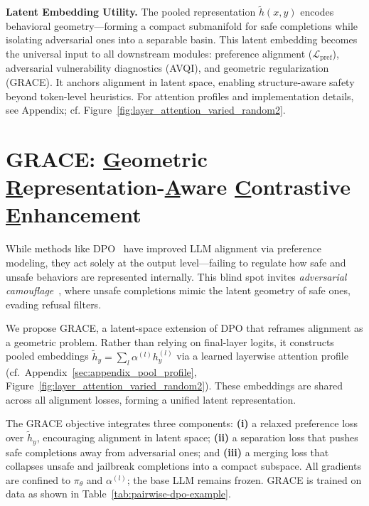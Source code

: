 \textbf{Latent Embedding Utility.} 
The pooled representation $\tilde{h}(x, y)$ encodes behavioral geometry—forming a compact submanifold for safe completions while isolating adversarial ones into a separable basin. This latent embedding becomes the universal input to all downstream modules: preference alignment ($\mathcal{L}_{\text{pref}}$), adversarial vulnerability diagnostics (AVQI), and geometric regularization (GRACE). It anchors alignment in latent space, enabling structure-aware safety beyond token-level heuristics. For attention profiles and implementation details, see Appendix; cf. Figure~\ref{fig:layer_attention_varied_random2}.








\section{\textsc{GRACE}: \underline{G}eometric \underline{R}epresentation-\underline{A}ware \underline{C}ontrastive \underline{E}nhancement}
\label{sec:grace_main}

While methods like DPO~\cite{rafailov2023direct} have improved LLM alignment via preference modeling, they act solely at the output level—failing to regulate how safe and unsafe behaviors are represented internally. This blind spot invites \emph{adversarial camouflage}~\cite{turpin2023llms, carlini2023extracting}, where unsafe completions mimic the latent geometry of safe ones, evading refusal filters.

We propose \textsc{GRACE}, a latent-space extension of DPO that reframes alignment as a geometric problem. Rather than relying on final-layer logits, it constructs pooled embeddings \(\tilde{h}_y = \sum_l \alpha^{(l)} h_y^{(l)}\) via a learned layerwise attention profile (cf.~Appendix~\ref{sec:appendix_pool_profile}, Figure~\ref{fig:layer_attention_varied_random2}). These embeddings are shared across all alignment losses, forming a unified latent representation.

The GRACE objective integrates three components: \textbf{(i)} a relaxed preference loss over \(\tilde{h}_y\), encouraging alignment in latent space; \textbf{(ii)} a separation loss that pushes safe completions away from adversarial ones; and \textbf{(iii)} a merging loss that collapses unsafe and jailbreak completions into a compact subspace. All gradients are confined to \(\pi_\theta\) and \(\alpha^{(l)}\); the base LLM remains frozen. GRACE is trained on data as shown in Table~\ref{tab:pairwise-dpo-example}.

